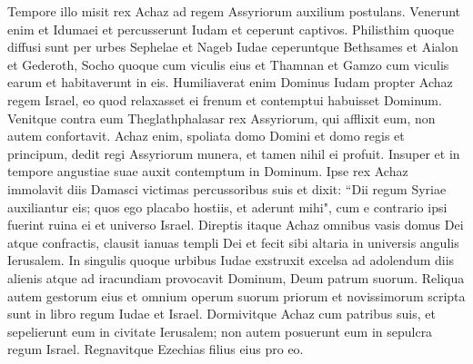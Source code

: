 \begin{biblechapter}
\verse Tempore illo misit rex Achaz ad regem Assyriorum auxilium postulans. 
\verse Venerunt enim et Idumaei et percusserunt Iudam et ceperunt captivos. 
\verse Philisthim quoque diffusi sunt per urbes Sephelae et Nageb Iudae ceperuntque Bethsames et Aialon et Gederoth, Socho quoque cum viculis eius et Thamnan et Gamzo cum viculis earum et habitaverunt in eis. 
\verse Humiliaverat enim Dominus Iudam propter Achaz regem Israel, eo quod relaxasset ei frenum et contemptui habuisset Dominum. 
\verse Venitque contra eum Theglathphalasar rex Assyriorum, qui afflixit eum, non autem confortavit. 
\verse Achaz enim, spoliata domo Domini et domo regis et principum, dedit regi Assyriorum munera, et tamen nihil ei profuit. 
\verse Insuper et in tempore angustiae suae auxit contemptum in Dominum. Ipse rex Achaz 
\verse immolavit diis Damasci victimas percussoribus suis et dixit: “Dii regum Syriae auxiliantur eis; quos ego placabo hostiis, et aderunt mihi", cum e contrario ipsi fuerint ruina ei et universo Israel. 
\verse Direptis itaque Achaz omnibus vasis domus Dei atque confractis, clausit ianuas templi Dei et fecit sibi altaria in universis angulis Ierusalem. 
\verse In singulis quoque urbibus Iudae exstruxit excelsa ad adolendum diis alienis atque ad iracundiam provocavit Dominum, Deum patrum suorum. 
\verse Reliqua autem gestorum eius et omnium operum suorum priorum et novissimorum scripta sunt in libro regum Iudae et Israel. 
\verse Dormivitque Achaz cum patribus suis, et sepelierunt eum in civitate Ierusalem; non autem posuerunt eum in sepulcra regum Israel. Regnavitque Ezechias filius eius pro eo. 
\end{biblechapter}

